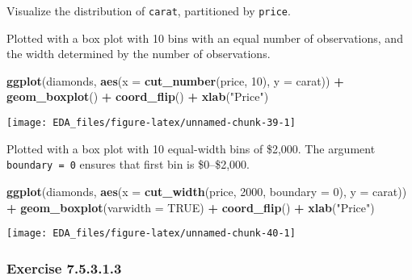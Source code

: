 \documentclass[]{book}
\newenvironment{Shaded}{\begin{snugshade}}{\end{snugshade}}
\newcommand{\DataTypeTok}[1]{\textcolor[rgb]{0.13,0.29,0.53}{#1}}
\newcommand{\DecValTok}[1]{\textcolor[rgb]{0.00,0.00,0.81}{#1}}
\newcommand{\KeywordTok}[1]{\textcolor[rgb]{0.13,0.29,0.53}{\textbf{#1}}}
\newcommand{\NormalTok}[1]{#1}
\newcommand{\OperatorTok}[1]{\textcolor[rgb]{0.81,0.36,0.00}{\textbf{#1}}}
\newcommand{\OtherTok}[1]{\textcolor[rgb]{0.56,0.35,0.01}{#1}}
\newcommand{\StringTok}[1]{\textcolor[rgb]{0.31,0.60,0.02}{#1}}
\theoremstyle{plain}
\theoremstyle{remark}
\begin{document}
Visualize the distribution of \texttt{carat}, partitioned by
\texttt{price}.

Plotted with a box plot with 10 bins with an equal number of
observations, and the width determined by the number of observations.

\begin{Shaded}
\begin{Highlighting}[]
\KeywordTok{ggplot}\NormalTok{(diamonds, }\KeywordTok{aes}\NormalTok{(}\DataTypeTok{x =} \KeywordTok{cut_number}\NormalTok{(price, }\DecValTok{10}\NormalTok{), }\DataTypeTok{y =}\NormalTok{ carat)) }\OperatorTok{+}
\StringTok{  }\KeywordTok{geom_boxplot}\NormalTok{() }\OperatorTok{+}
\StringTok{  }\KeywordTok{coord_flip}\NormalTok{() }\OperatorTok{+}
\StringTok{  }\KeywordTok{xlab}\NormalTok{(}\StringTok{"Price"}\NormalTok{)}
\end{Highlighting}
\end{Shaded}

\begin{center}\texttt{[image: EDA\_files/figure-latex/unnamed-chunk-39-1]} \end{center}

Plotted with a box plot with 10 equal-width bins of \$2,000. The
argument \texttt{boundary\ =\ 0} ensures that first bin is \$0--\$2,000.

\begin{Shaded}
\begin{Highlighting}[]
\KeywordTok{ggplot}\NormalTok{(diamonds, }\KeywordTok{aes}\NormalTok{(}\DataTypeTok{x =} \KeywordTok{cut_width}\NormalTok{(price, }\DecValTok{2000}\NormalTok{, }\DataTypeTok{boundary =} \DecValTok{0}\NormalTok{), }\DataTypeTok{y =}\NormalTok{ carat)) }\OperatorTok{+}
\StringTok{  }\KeywordTok{geom_boxplot}\NormalTok{(}\DataTypeTok{varwidth =} \OtherTok{TRUE}\NormalTok{) }\OperatorTok{+}
\StringTok{  }\KeywordTok{coord_flip}\NormalTok{() }\OperatorTok{+}
\StringTok{  }\KeywordTok{xlab}\NormalTok{(}\StringTok{"Price"}\NormalTok{)}
\end{Highlighting}
\end{Shaded}

\begin{center}\texttt{[image: EDA\_files/figure-latex/unnamed-chunk-40-1]} \end{center}

\hypertarget{exercise-7.5.3.1.3}{%
\subsubsection*{\texorpdfstring{Exercise
{7.5.3.1.3}}{Exercise 7.5.3.1.3}}\label{exercise-7.5.3.1.3}}
\end{document}

